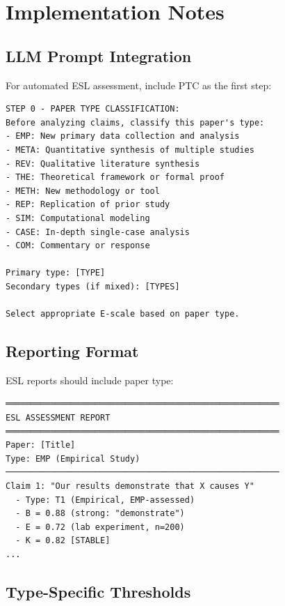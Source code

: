 \documentclass[11pt,a4paper]{article}
\begin{document}

\section{Implementation Notes}
\label{sec:implementation}

\subsection{LLM Prompt Integration}

For automated ESL assessment, include PTC as the first step:

\begin{verbatim}
STEP 0 - PAPER TYPE CLASSIFICATION:
Before analyzing claims, classify this paper's type:
- EMP: New primary data collection and analysis
- META: Quantitative synthesis of multiple studies
- REV: Qualitative literature synthesis
- THE: Theoretical framework or formal proof
- METH: New methodology or tool
- REP: Replication of prior study
- SIM: Computational modeling
- CASE: In-depth single-case analysis
- COM: Commentary or response

Primary type: [TYPE]
Secondary types (if mixed): [TYPES]

Select appropriate E-scale based on paper type.
\end{verbatim}

\subsection{Reporting Format}

ESL reports should include paper type:

\begin{verbatim}
═══════════════════════════════════════════════════════
ESL ASSESSMENT REPORT
═══════════════════════════════════════════════════════
Paper: [Title]
Type: EMP (Empirical Study)
───────────────────────────────────────────────────────
Claim 1: "Our results demonstrate that X causes Y"
  - Type: T1 (Empirical, EMP-assessed)
  - B = 0.88 (strong: "demonstrate")
  - E = 0.72 (lab experiment, n=200)
  - K = 0.82 [STABLE]
...
\end{verbatim}

\subsection{Type-Specific Thresholds}
\end{document}

